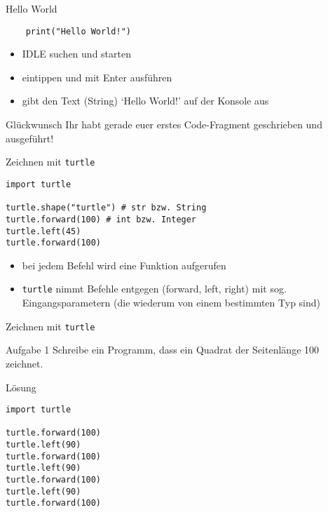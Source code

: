 \begin{frame}[fragile]{Hello World}
    \begin{lstlisting}
    print("Hello World!")
    \end{lstlisting}
    \begin{itemize}
        \item IDLE suchen und starten
        \item eintippen und mit Enter ausführen
        \item gibt den Text (String) `Hello World!' auf der Konsole aus
    \end{itemize}
    \begin{exampleblock}{Glückwunsch}
    Ihr habt gerade euer erstes Code-Fragment geschrieben und ausgeführt!
    \end{exampleblock}
\end{frame}

\begin{frame}[fragile]{Zeichnen mit \texttt{turtle}}
    \begin{lstlisting}
import turtle

turtle.shape("turtle") # str bzw. String
turtle.forward(100) # int bzw. Integer
turtle.left(45)
turtle.forward(100)
    \end{lstlisting}
    \begin{itemize}
        \item bei jedem Befehl wird eine Funktion aufgerufen
        \item \texttt{turtle} nimmt Befehle entgegen (forward, left, right) mit sog. 
        Eingangsparametern (die wiederum von einem bestimmten Typ sind)
    \end{itemize}
\end{frame}

\begin{frame}[fragile]{Zeichnen mit \texttt{turtle}}
    \begin{block}{Aufgabe 1}
        Schreibe ein Programm, dass ein Quadrat der Seitenlänge 100 zeichnet.
    \end{block}
    \pause{}
    \begin{exampleblock}{Lösung}
        \begin{lstlisting}
import turtle

turtle.forward(100)
turtle.left(90)
turtle.forward(100)
turtle.left(90)
turtle.forward(100)
turtle.left(90)
turtle.forward(100)
        \end{lstlisting}
    \end{exampleblock}
\end{frame}

